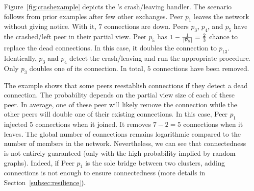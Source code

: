 Figure~\ref{fig:crashexample} depicts the \SPRAY{}'s crash/leaving
handler. The scenario follows from prior examples after few other
exchanges. Peer $p_1$ leaves the network without giving notice. With
it, $7$ connections are down. Peers $p_3$, $p_4$, and $p_5$ have the
crashed/left peer in their partial view. Peer $p_5$ has
$1-{1\over{|\mathcal{P}_5|}}={2\over{3}}$ chance to replace the dead
connections. In this case, it doubles the connection to
$p_{13}$. Identically, $p_3$ and $p_4$ detect the crash/leaving and
run the appropriate procedure. Only $p_3$ doubles one of its
connection. In total, $5$ connections have been removed.  

The example shows that some peers reestablish connections if they
detect a dead connection. The probability depends on the partial view
size of each of these peer. In average, one of these peer will likely
remove the connection while the other peers will double one of their
existing connections. In this case, Peer $p_1$ injected $5$
connections when it joined. It removes $7-2 =5 $ connections when it
leaves. The global number of connections remains logarithmic compared
to the number of members in the network. Nevertheless, we can see that
connectedness is not entirely guaranteed (only with the high
probability implied by random graphs). Indeed, if Peer $p_1$ is the
sole bridge between two clusters, adding connections is not enough to
ensure connectedness (more details in
Section~\ref{subsec:resilience}).


